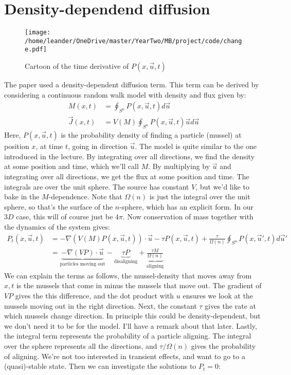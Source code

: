 \documentclass[a4paper]{jpconf}
\begin{document}
\section{Density-dependend diffusion}
\begin{figure}[h!]
    \centering
    \texttt{[image: /home/leander/OneDrive/master/YearTwo/MB/project/code/change.pdf]}
    \caption{Cartoon of the time derivative of $P(x,\vec u,t)$}
\end{figure}
The paper used a density-dependent diffusion term. This term can be derived by considering a continuous random walk model with density and flux given by:
\[\begin{aligned}
M(x,t) &= \oint_{S^n} P(x,\vec u,t)d\vec u\\
\vec J(x,t) &=V(M) \oint_{S^n} P(x,\vec u,t)\vec ud\vec u
\end{aligned}\]
Here, $P(x,\vec u,t)$ is the probability density of finding a particle (mussel) at position $x$, at time $t$, going in direction $\vec u$. The model is quite similar to the one introduced in the lecture. By integrating over all directions, we find the density at some position and time, which we'll call $M$. By multiplying by $\vec u$ and integrating over all directions, we get the flux at some position and time. The integrals are over the unit sphere. The source \cite{schnitzer} has constant $V$, but we'd like to bake in the $M$-dependence. Note that $\Omega(n)$ is just the integral over the unit sphere, so that's the surface of the $n$-sphere, which has an explicit form. In our $3D$ case, this will of course just be $4\pi$. Now conservation of mass together with the dynamics of the system gives:
\[\begin{aligned}
P_t(x,\vec u,t) &= -\nabla(V(M)P(x,\vec u,t))\cdot \vec u -\tau P(x,\vec u,t)+\frac{\tau }{\Omega(n)}\oint_{S^n}P(x,\vec u',t)d\vec u'\\
&=\underbrace{-\nabla(VP)\cdot \vec u}_{\text{particles moving out}}-\underbrace{\tau P}_{\text{disaligning}}+\underbrace{\frac{\tau M}{\Omega(n)}}_{\text{aligning}}
\end{aligned}\]
We can explain the terms as follows, the mussel-density that moves away from $x,t$ is the mussels that come in minus the mussels that move out. The gradient of $VP$ gives the this difference, and the dot product with $u$ ensures we look at the mussels moving out in the right direction. Next, the constant $\tau$ gives the rate at which mussels change direction. In principle this could be density-dependent, but we don't need it to be for the model. I'll have a remark about that later. Lastly, the integral term represents the probability of a particle aligning. The integral over the sphere represents all the directions, and $\tau/\Omega(n)$ gives the probability of aligning. We're not too interested in transient effects, and want to go to a (quasi)-stable state. Then we can investigate the solutions to $P_t=0$:
\end{document}
